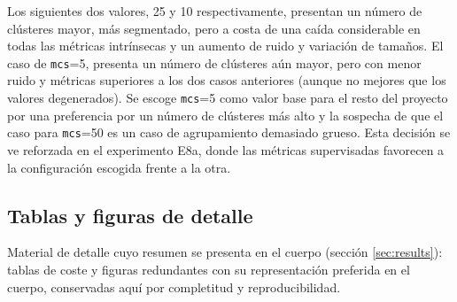 Los siguientes dos valores, 25 y 10 respectivamente, presentan un número de
clústeres mayor, más segmentado, pero a costa de una caída considerable en
todas las métricas intrínsecas y un aumento de ruido y variación de tamaños. El
caso de \texttt{mcs}=5, presenta un número de clústeres aún mayor, pero con
menor ruido y métricas superiores a los dos casos anteriores (aunque no mejores
que los valores degenerados). Se escoge \texttt{mcs}=5 como valor base para el
resto del proyecto por una preferencia por un número de clústeres más alto y la
sospecha de que el caso para \texttt{mcs}=50 es un caso de agrupamiento
demasiado grueso. Esta decisión se ve reforzada en el experimento E8a, donde
las métricas supervisadas favorecen a la configuración escogida frente a la
otra.

\subsection{Tablas y figuras de detalle}
\label{anexo:detalle}
Material de detalle cuyo resumen se presenta en el cuerpo (sección
\ref{sec:results}): tablas de coste y figuras redundantes con su representación
preferida en el cuerpo, conservadas aquí por completitud y reproducibilidad.

